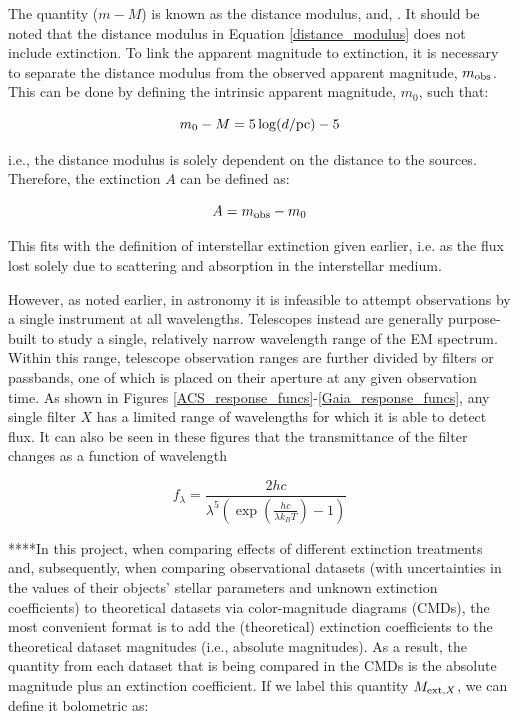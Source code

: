 \documentclass[12pt, a4paper]{report}
\begin{document}
The quantity ($m - M$) is known as the distance modulus, and, . It should be noted that the distance modulus in Equation \ref{distance_modulus} does not include extinction. To link the apparent magnitude to extinction, it is necessary to separate the distance modulus from the observed apparent magnitude, $m_{\textnormal{obs}}$. This can be done by defining the intrinsic apparent magnitude, $m_{0}$, such that:

\begin{equation}
\label{intrinsic_app_mag}
m_{0} - M = 5\log(d/\textnormal{pc}) - 5
\end{equation}

i.e., the distance modulus is solely dependent on the distance to the  sources. Therefore, the extinction $A$ can be defined as:

\begin{equation}
\label{bol_extinc}
A = m_{\textnormal{obs}} - m_{0}
\end{equation}

This fits with the definition of interstellar extinction given earlier, i.e. as the flux lost solely due to scattering and absorption in the interstellar medium.

However, as noted earlier, in astronomy it is infeasible to attempt observations by a single instrument at all wavelengths. Telescopes instead are generally purpose-built to study a single, relatively narrow wavelength range of the EM spectrum. Within this range, telescope observation ranges are further divided by filters or passbands, one of which is placed on their aperture at any given observation time. As shown in Figures \ref{ACS_response_funcs}-\ref{Gaia_response_funcs}, any single filter $X$ has a limited range of wavelengths for which it is able to detect flux. It can also be seen in these figures that the transmittance of the filter changes as a function of wavelength

\begin{equation}
f_{\lambda} = \frac{2hc}{\lambda^{5}\left(\exp\left({\frac{hc}{\lambda k_{B}T}}\right) - 1\right)}
\label{planck_bb}
\end{equation} 

****In this project, when comparing effects of different extinction treatments and, subsequently, when comparing observational datasets (with uncertainties in the values of their objects' stellar parameters and unknown extinction coefficients) to theoretical datasets via color-magnitude diagrams (CMDs), the most convenient format is to add the (theoretical) extinction coefficients to the theoretical dataset magnitudes (i.e., absolute magnitudes). As a result, the quantity from each dataset that is being compared in the CMDs is the absolute magnitude plus an extinction coefficient. If we label this quantity $M_{\textnormal{ext},X}$, we can define it bolometric as:
\end{document}
